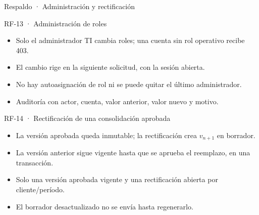 \documentclass[aspectratio=169,10pt]{beamer}
\begin{document}
\begin{frame}{Respaldo · Administración y rectificación}
  \small
  \begin{block}{RF-13 · Administración de roles}
    \begin{itemize}
      \item Solo el administrador TI cambia roles; una cuenta sin rol operativo recibe 403.
      \item El cambio rige en la siguiente solicitud, con la sesión abierta.
      \item No hay autoasignación de rol ni se puede quitar el último administrador.
      \item Auditoría con actor, cuenta, valor anterior, valor nuevo y motivo.
    \end{itemize}
  \end{block}
  \begin{block}{RF-14 · Rectificación de una consolidación aprobada}
    \begin{itemize}
      \item La versión aprobada queda inmutable; la rectificación crea \(v_{n+1}\) en borrador.
      \item La versión anterior sigue vigente hasta que se aprueba el reemplazo, en una transacción.
      \item Solo una versión aprobada vigente y una rectificación abierta por cliente/período.
      \item El borrador desactualizado no se envía hasta regenerarlo.
    \end{itemize}
  \end{block}
\end{frame}
\end{document}
